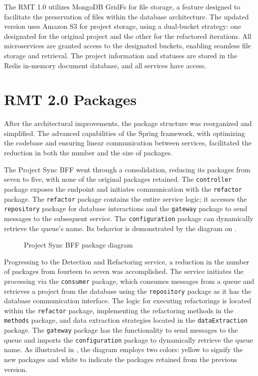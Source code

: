 The RMT 1.0 utilizes MongoDB GridFs for file storage, a feature designed to facilitate the preservation of files within the database architecture. The updated version uses Amazon S3 for project storage, using a dual-bucket strategy: one designated for the original project and the other for the refactored iterations. All microservices are granted access to the designated buckets, enabling seamless file storage and retrieval. The project information and statuses are stored in the Redis in-memory document database, and all services have access.

\section{RMT 2.0 Packages}
\label{sec-packages}

After the architectural improvements, the package structure was reorganized and simplified. The advanced capabilities of the Spring framework, with optimizing the codebase and ensuring linear communication between services, facilitated the reduction in both the number and the size of packages.

The Project Sync BFF went through a consolidation, reducing its packages from seven to five, with none of the original packages retained. The \texttt{controller} package exposes the endpoint and initiates communication with the \texttt{refactor} package. The \texttt{refactor} package contains the entire service logic; it accesses the \texttt{ repository} package for database interactions and the \texttt{gateway} package to send messages to the subsequent service. The \texttt{configuration} package can dynamically retrieve the queue's name. Its behavior is demonstrated by the diagram on .

\begin{figure}[ht!]
\SetCaptionWidth{\textwidth}
\caption{Project Sync BFF package diagram}
\label{fig-project-sync-package}
\fontsize{8}{10}\selectfont

\end{figure}
\FloatBarrier

Progressing to the Detection and Refactoring service, a reduction in the number of packages from fourteen to seven was accomplished. The service initiates the processing via the \texttt{consumer} package, which consumes messages from a queue and retrieves a project from the database using the \texttt{repository} package as it has the database communication interface. The logic for executing refactorings is located within the \texttt{refactor} package, implementing the refactoring methods in the \texttt{methods} package, and data extraction strategies located in the \texttt{dataExtraction} package. The \texttt{gateway} package has the functionality to send messages to the queue and imports the \texttt{configuration} package to dynamically retrieve the queue name. As illustrated in , the diagram employs two colors: yellow to signify the new packages and white to indicate the packages retained from the previous version.


